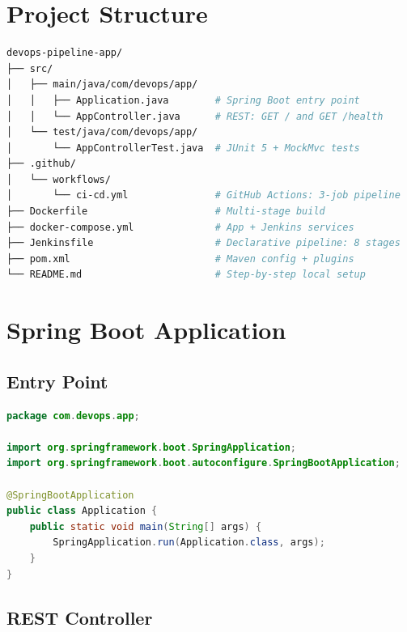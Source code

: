 \documentclass[12pt,a4paper]{report}
\begin{document}
\section{Project Structure}

\begin{lstlisting}[language=bash, caption=Full Project Directory Layout]
devops-pipeline-app/
├── src/
│   ├── main/java/com/devops/app/
│   │   ├── Application.java        # Spring Boot entry point
│   │   └── AppController.java      # REST: GET / and GET /health
│   └── test/java/com/devops/app/
│       └── AppControllerTest.java  # JUnit 5 + MockMvc tests
├── .github/
│   └── workflows/
│       └── ci-cd.yml               # GitHub Actions: 3-job pipeline
├── Dockerfile                      # Multi-stage build
├── docker-compose.yml              # App + Jenkins services
├── Jenkinsfile                     # Declarative pipeline: 8 stages
├── pom.xml                         # Maven config + plugins
└── README.md                       # Step-by-step local setup
\end{lstlisting}

\section{Spring Boot Application}

\subsection{Entry Point}

\begin{lstlisting}[language=Java, caption=Application.java]
package com.devops.app;

import org.springframework.boot.SpringApplication;
import org.springframework.boot.autoconfigure.SpringBootApplication;

@SpringBootApplication
public class Application {
    public static void main(String[] args) {
        SpringApplication.run(Application.class, args);
    }
}
\end{lstlisting}

\subsection{REST Controller}
\end{document}
